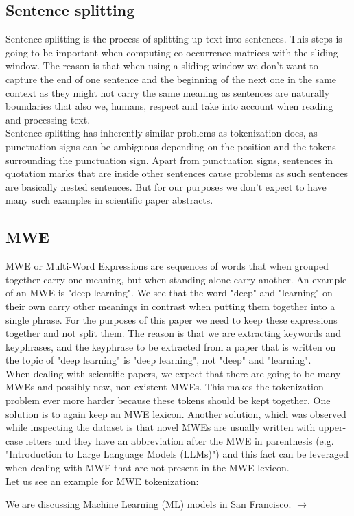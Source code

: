 \documentclass[12pt]{article}
\numberwithin{equation}{section}
\begin{document}
\begin{spacing}{1.5}
	\subsection{Sentence splitting}
	Sentence splitting is the process of splitting up text into sentences. This steps is going to be important when computing co-occurrence matrices with the sliding window. The reason is that when using a sliding window we don't want to capture the end of one sentence and the beginning of the next one in the same context as they might not carry the same meaning as sentences are naturally boundaries that also we, humans, respect and take into account when reading and processing text. \\
	Sentence splitting has inherently similar problems as tokenization does, as punctuation signs can be ambiguous depending on the position and the tokens surrounding the punctuation sign. Apart from punctuation signs, sentences in quotation marks that are inside other sentences cause problems as such sentences are basically nested sentences. But for our purposes we don't expect to have many such examples in scientific paper abstracts.
	
	\subsection{MWE}
	MWE or Multi-Word Expressions are sequences of words that when grouped together carry one meaning, but when standing alone carry another. An example of an MWE is "deep learning". We see that the word "deep" and "learning" on their own carry other meanings in contrast when putting them together into a single phrase. For the purposes of this paper we need to keep these expressions together and not split them. The reason is that we are extracting keywords and keyphrases, and the keyphrase to be extracted from a paper that is written on the topic of "deep learning" is "deep learning", not "deep" and "learning". \\
	When dealing with scientific papers, we expect that there are going to be many MWEs and possibly new, non-existent MWEs. This makes the tokenization problem ever more harder because these tokens should be kept together. One solution is to again keep an MWE lexicon. Another solution, which was observed while inspecting the dataset is that novel MWEs are usually written with upper-case letters and they have an abbreviation after the MWE in parenthesis (e.g. "Introduction to Large Language Models (LLMs)") and this fact can be leveraged when dealing with MWE that are not present in the MWE lexicon. \\
	Let us see an example for MWE tokenization:
	\begin{center}
		We are discussing Machine Learning (ML) models in San Francisco. $\rightarrow$ \\
		

\end{center}
\end{spacing}
\end{document}
